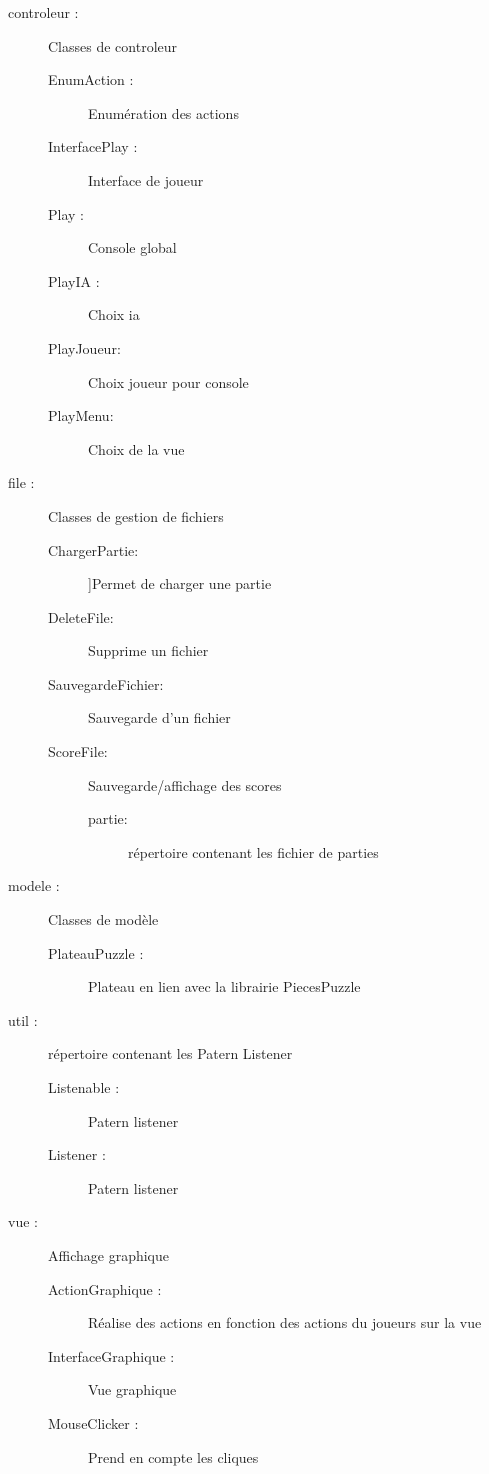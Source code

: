     \begin{description}
        \item[controleur :]{Classes de controleur}
            \begin{description}
                \item[EnumAction :]{Enumération des actions}
                \item[InterfacePlay :]{Interface de joueur}
                \item[Play :]{Console global}
                \item[PlayIA :]{Choix ia}
                \item[PlayJoueur:]{Choix joueur pour console}
                \item[PlayMenu:]{Choix de la vue}
            \end{description}
        \item[file :]{Classes de gestion de fichiers}
            \begin{description}
                \item[ChargerPartie:]]{Permet de charger une partie}
                \item[DeleteFile:]{Supprime un fichier}
                \item[SauvegardeFichier:]{Sauvegarde d'un fichier}
                \item[ScoreFile:]{Sauvegarde/affichage des scores}
                \begin{description}
                    \item[partie:]{répertoire contenant les fichier de parties}
                \end{description}
            \end{description}
        \item[modele :]{Classes de modèle}
        \begin{description}
            \item[PlateauPuzzle :]{Plateau en lien avec la librairie PiecesPuzzle}
        \end{description}
        \item[util :]{répertoire contenant les Patern Listener}
        \begin{description}
            \item[Listenable :]{Patern listener}
            \item[Listener :]{Patern listener}
        \end{description}
        \item[vue :]{Affichage graphique}
        \begin{description}
            \item[ActionGraphique :]{Réalise des actions en fonction des actions du joueurs sur la vue}
            \item[InterfaceGraphique :]{Vue graphique}
            \item[MouseClicker :]{Prend en compte les cliques}
        \end{description}
    \end{description}
